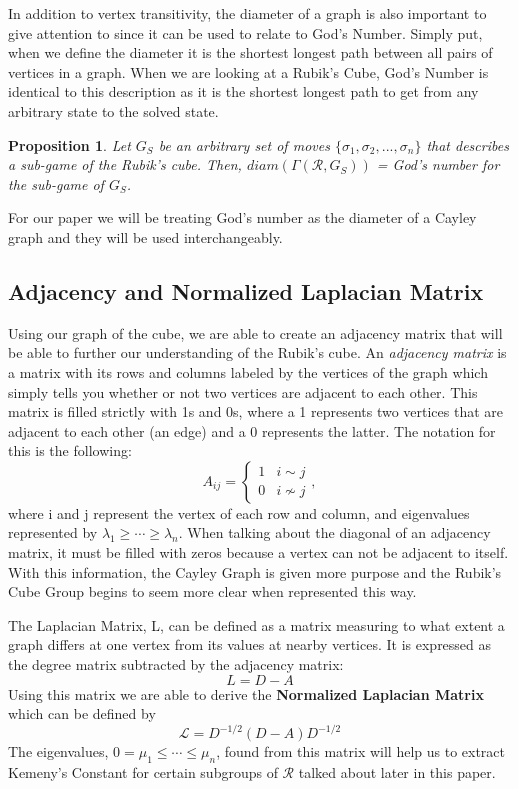 \documentclass{article}
\newtheorem{proposition}[theorem]{Proposition}
\begin{document}
In addition to vertex transitivity, the diameter of a graph is also important to give attention to since it can be used to relate to God's Number.  Simply put, when we define the diameter it is the shortest longest path between all pairs of vertices in a graph.  When we are looking at a Rubik's Cube, God's Number is identical to this description as it is the shortest longest path to get from any arbitrary state to the solved state.

\begin{proposition}
Let $G_S$ be an arbitrary set of moves $\{\sigma_1, \sigma_2, ... , \sigma_n\}$ that describes a sub-game of the Rubik's cube.  Then, $diam(\Gamma(\mathcal{R}, G_S))$ = God's number for the sub-game of $G_S$.
\end{proposition}
For our paper we will be treating God's number as the diameter of a Cayley graph and they will be used interchangeably.

\subsection{Adjacency and Normalized Laplacian Matrix}
Using our graph of the cube, we are able to create an adjacency matrix that will be able to further our understanding of the Rubik's cube.  An \emph{adjacency matrix} is a matrix with its rows and columns labeled by the vertices of the graph which simply tells you whether or not two vertices are adjacent to each other.  This matrix is filled strictly with 1s and 0s, where a 1 represents two vertices that are adjacent to each other (an edge) and a 0 represents the latter.  The notation for this is the following: $$A_{ij} = \begin{cases} 1 &  i \sim j \\ 0 & i \not\sim j \end{cases},$$ where i and j represent the vertex of each row and column, and eigenvalues represented by $\lambda_1 \geq \cdots \geq \lambda_n$.  When talking about the diagonal of an adjacency matrix, it must be filled with zeros because a vertex can not be adjacent to itself.  With this information, the Cayley Graph is given more purpose and the Rubik’s Cube Group begins to seem more clear when represented this way.

The Laplacian Matrix, L, can be defined as a matrix measuring to what extent a graph differs at one vertex from its values at nearby vertices.  It is expressed as the degree matrix subtracted by the adjacency matrix: $$L = D - A$$  Using this matrix we are able to derive the \textbf{Normalized Laplacian Matrix} which can be defined by $$\mathcal{L} = D^{-1/2}(D-A)D^{-1/2}$$ The eigenvalues, $0 = \mu_1\leq \cdots \leq \mu_n$, found from this matrix will help us to extract Kemeny's Constant for certain subgroups of $\mathcal{R}$ talked about later in this paper.
\end{document}
